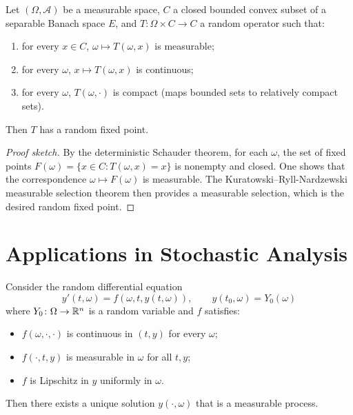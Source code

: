 \begin{theorem}
\label{thm:random-fp-schauder}
Let $(\Omega, \mathcal{A})$ be a measurable space, $C$ a closed bounded convex subset of a
separable Banach space $E$, and $T\colon \Omega \times C \to C$ a random operator such that:
\begin{enumerate}
  \item for every $x \in C$, $\omega \mapsto T(\omega, x)$ is measurable;
  \item for every $\omega$, $x \mapsto T(\omega, x)$ is continuous;
  \item for every $\omega$, $T(\omega, \cdot)$ is compact (maps bounded sets to relatively
    compact sets).
\end{enumerate}
Then $T$ has a random fixed point.
\end{theorem}

\begin{proof}[Proof sketch]
By the deterministic Schauder theorem, for each $\omega$, the set of fixed points
$F(\omega) = \{x \in C : T(\omega, x) = x\}$ is nonempty and closed. One shows that the
correspondence $\omega \mapsto F(\omega)$ is measurable. The Kuratowski--Ryll-Nardzewski
measurable selection theorem then provides a measurable selection, which is the desired
random fixed point.
\end{proof}

\section{Applications in Stochastic Analysis}

\begin{proposition}
Consider the random differential equation
\[
  y'(t, \omega) = f(\omega, t, y(t, \omega)), \qquad y(t_0, \omega) = Y_0(\omega)
\]
where $Y_0\colon \Omega \to \mathbb{R}^n$ is a random variable and $f$ satisfies:
\begin{itemize}
  \item $f(\omega, \cdot, \cdot)$ is continuous in $(t,y)$ for every $\omega$;
  \item $f(\cdot, t, y)$ is measurable in $\omega$ for all $t, y$;
  \item $f$ is Lipschitz in $y$ uniformly in $\omega$.
\end{itemize}
Then there exists a unique solution $y(\cdot, \omega)$ that is a measurable process.
\end{proposition}

